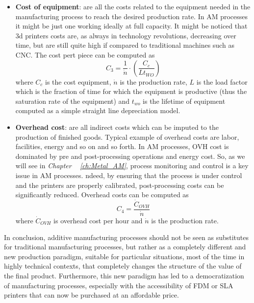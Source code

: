 \begin{itemize}
    \item \textbf{Cost of equipment}: are all the costs related to the equipment needed in the manufacturing process to reach the desired production rate. In AM processes it might be just one working ideally at full capacity. It might be noticed that 3d printers costs are, as always in technology revolutions, decreasing over time, but are still quite high if compared to traditional machines such as CNC. The cost pert piece can be computed as
    \begin{equation}\label{eq:cost_equipment}
        C_3 = \frac{1}{\dot{n}} \cdot \left( \frac{C_c}{Lt_{WO}}\right)
    \end{equation}
    where $C_c$ is the cost equipment, $\dot{n}$ is the production rate, $L$ is the load factor which is the fraction of time for which the equipment is productive (thus the saturation rate of the equipment) and $t_{wo}$ is the lifetime of equipment computed as a simple straight line depreciation model.
    \item \textbf{Overhead cost}: are all indirect costs which can be imputed to the production of finished goods. Typical example of overhead costs are labor, facilities, energy and so on and so forth. In AM processes, OVH cost is dominated by pre and post-processing operations and energy cost. So, as we will see in \textit{Chapter ~ \ref{ch:Metal_AM}}, process monitoring and control is a key issue in AM processes. ndeed, by ensuring that the process is under control and the printers are properly calibrated, post-processing costs can be significantly reduced. Overhead costs can be computed as
    \begin{equation}\label{eq:OVH_cost}
        C_4 = \frac{\dot{C}_{OVH}}{\dot{n}}
    \end{equation}
    where $\dot{C}_{OVH}$ is overhead cost per hour and $\dot{n}$ is the production rate.
    \end{itemize}

In conclusion, additive manufacturing processes should not be seen as substitutes for traditional manufacturing processes, but rather as a completely different and new production paradigm, suitable for particular situations, most of the time in highly technical contexts, that completely changes the structure of the value of the final product. Furthermore, this new paradigm has led to a democratization of manufacturing processes, especially with the accessibility of FDM or SLA printers that can now be purchased at an affordable price.